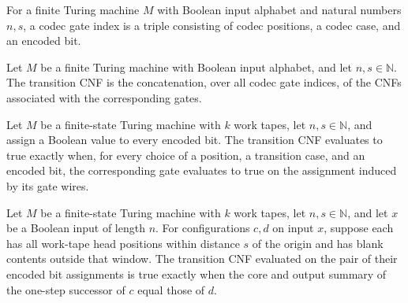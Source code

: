 \begin{definition}
\label{Complexity.CodecGateIndex}
\leanok
{}
For a finite Turing machine $M$ with Boolean input alphabet and natural numbers $n,s$, a
codec gate index is a triple consisting of codec positions, a codec case, and an encoded
bit.
\end{definition}

\begin{definition}
\label{Complexity.codecTransitionCNF}
\leanok
{}
Let $M$ be a finite Turing machine with Boolean input alphabet, and let
$n,s\in\mathbb{N}$. The transition CNF is the concatenation, over all codec gate
indices, of the CNFs associated with the corresponding gates.
\end{definition}

\begin{theorem}
\label{Complexity.codecTransitionCNF_eval}
\leanok
{}
Let $M$ be a finite-state Turing machine with $k$ work tapes, let $n,s\in\mathbb{N}$,
and assign a Boolean value to every encoded bit. The transition CNF evaluates to true
exactly when, for every choice of a position, a transition case, and an encoded bit, the
corresponding gate evaluates to true on the assignment induced by its gate wires.
\end{theorem}

\begin{theorem}
\label{Complexity.codecTransitionCNF_step_iff}
\leanok
{}
Let $M$ be a finite-state Turing machine with $k$ work tapes, let $n,s\in\mathbb{N}$,
and let $x$ be a Boolean input of length $n$. For configurations $c,d$ on input $x$,
suppose each has all work-tape head positions within distance $s$ of the origin and has
blank contents outside that window. The transition CNF evaluated on the pair of their
encoded bit assignments is true exactly when the core and output summary of the one-step
successor of $c$ equal those of $d$.
\end{theorem}

